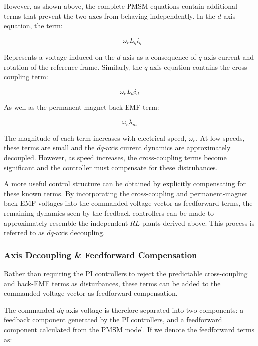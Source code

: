 \documentclass{article}
\begin{document}
However, as shown above, the complete PMSM equations contain additional terms that prevent the two axes from behaving independently. In the $d$-axis equation, the term:

\begin{equation}
    -\omega_eL_qi_q
\end{equation}

Represents a voltage induced on the $d$-axis as a consequence of $q$-axis current and rotation of the reference frame. Similarly, the $q$-axis equation contains the cross-coupling term:

\begin{equation}
    \omega_eL_di_d
\end{equation}

As well as the permanent-magnet back-EMF term:

\begin{equation}
    \omega_e\lambda_m
\end{equation}

The magnitude of each term increases with electrical speed, $\omega_e$. At low speeds, these terms are small and the $dq$-axis current dynamics are approximately decoupled. However, as speed increases, the cross-coupling terms become significant and the controller must compensate for these distrubances.

A more useful control structure can be obtained by explicitly compensating for these known terms. By incorporating the cross-coupling and permanent-magnet back-EMF voltages into the commanded voltage vector as feedforward terms, the remaining dynamics seen by the feedback controllers can be made to approximately resemble the independent $RL$ plants derived above. This process is referred to as $dq$-axis decoupling.


\subsubsection{Axis Decoupling \& Feedforward Compensation}
\label{sec:axis-decoupling-ff-compensation}

Rather than requiring the PI controllers to reject the predictable cross-coupling and back-EMF terms as disturbances, these terms can be added to the commanded voltage vector as feedforward compensation.

The commanded $dq$-axis voltage is therefore separated into two components: a feedback component generated by the PI controllers, and a feedforward component calculated from the PMSM model. If we denote the feedforward terms as:
\end{document}
